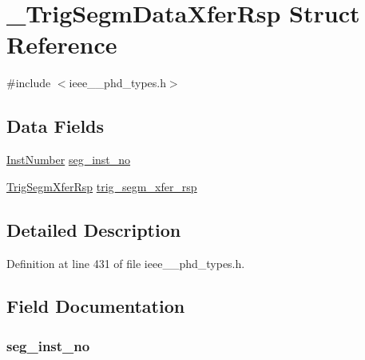 \hypertarget{struct___trig_segm_data_xfer_rsp}{}\section{\+\_\+\+Trig\+Segm\+Data\+Xfer\+Rsp Struct Reference}
\label{struct___trig_segm_data_xfer_rsp}


{\ttfamily \#include $<$ieee\+\_\+\_\+phd\+\_\+types.\+h$>$}

\subsection*{Data Fields}
\begin{DoxyCompactItemize}
\item 
\hyperlink{ieee__11073__phd__types_8h_ab78fcfd5f6e61b2c8de677df291cc4d7}{Inst\+Number} \hyperlink{struct___trig_segm_data_xfer_rsp_adf7e08dd5bd0cc5b6bdd34f692c64f24}{seg\+\_\+inst\+\_\+no}
\item 
\hyperlink{ieee__11073__phd__types_8h_ac76eb69f312b3b9c7ba98b2fcc75c221}{Trig\+Segm\+Xfer\+Rsp} \hyperlink{struct___trig_segm_data_xfer_rsp_ab48acc575126d5f1ae707e2dca4488b1}{trig\+\_\+segm\+\_\+xfer\+\_\+rsp}
\end{DoxyCompactItemize}


\subsection{Detailed Description}


Definition at line 431 of file ieee\+\_\+\_\+phd\+\_\+types.\+h.



\subsection{Field Documentation}
\hypertarget{struct___trig_segm_data_xfer_rsp_adf7e08dd5bd0cc5b6bdd34f692c64f24}{}
\subsubsection[{seg\+\_\+inst\+\_\+no}]{ seg\+\_\+inst\+\_\+no}\label{struct___trig_segm_data_xfer_rsp_adf7e08dd5bd0cc5b6bdd34f692c64f24}


